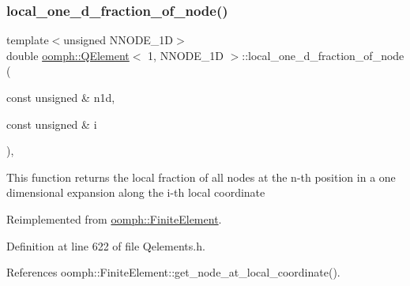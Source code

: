 \mbox{\label{classoomph_1_1QElement_3_011_00_01NNODE__1D_01_4_ab3a43b3caceeadfda93a7a50740a9154}} 
\subsubsection{\texorpdfstring{local\+\_\+one\+\_\+d\+\_\+fraction\+\_\+of\+\_\+node()}{local\_one\_d\_fraction\_of\_node()}}
{\footnotesize\ttfamily template$<$unsigned N\+N\+O\+D\+E\+\_\+1D$>$ \\
double \hyperlink{classoomph_1_1QElement}{oomph\+::\+Q\+Element}$<$ 1, N\+N\+O\+D\+E\+\_\+1D $>$\+::local\+\_\+one\+\_\+d\+\_\+fraction\+\_\+of\+\_\+node (\begin{DoxyParamCaption}\item[{const unsigned \&}]{n1d,  }\item[{const unsigned \&}]{i }\end{DoxyParamCaption})\hspace{0.3cm}{\ttfamily [inline]}, {\ttfamily [virtual]}}

This function returns the local fraction of all nodes at the n-\/th position in a one dimensional expansion along the i-\/th local coordinate 

Reimplemented from \hyperlink{classoomph_1_1FiniteElement_adb8ec7d2ceda37528c2d4542d572edf4}{oomph\+::\+Finite\+Element}.



Definition at line 622 of file Qelements.\+h.



References oomph\+::\+Finite\+Element\+::get\+\_\+node\+\_\+at\+\_\+local\+\_\+coordinate().

\mbox{\label{classoomph_1_1QElement_3_011_00_01NNODE__1D_01_4_aa37c4b1c77e3799a64667676ca445eb2}} 
